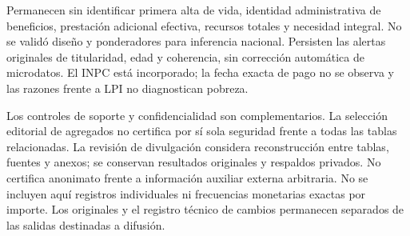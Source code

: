 Permanecen sin identificar primera alta de vida, identidad administrativa
de beneficios, prestación adicional efectiva, recursos totales y necesidad
integral. No se validó diseño y ponderadores para inferencia nacional.
Persisten las alertas originales de titularidad, edad y coherencia, sin
corrección automática de microdatos. El INPC está incorporado; la fecha
exacta de pago no se observa y las razones frente a LPI no diagnostican pobreza.

Los controles de soporte y confidencialidad son complementarios. La selección
editorial de agregados no certifica por sí sola seguridad frente a todas las
tablas relacionadas. La revisión de divulgación considera reconstrucción entre tablas, fuentes y
anexos; se conservan resultados originales y respaldos privados. No certifica
anonimato frente a información auxiliar externa arbitraria.
No se incluyen aquí registros individuales ni frecuencias monetarias exactas
por importe. Los originales y el registro técnico de cambios permanecen
separados de las salidas destinadas a difusión.
